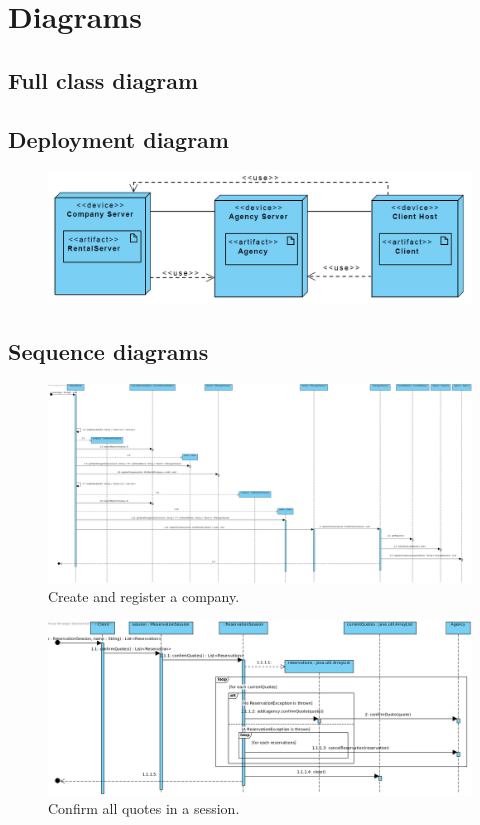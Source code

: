 \documentclass[10pt,a4paper]{article}
\begin{document}
\section{Diagrams}

\subsection{Full class diagram}
 
\clearpage

\subsection{Deployment diagram}
\begin{figure}[ht!]
\centering
\includegraphics[width=160mm]{DeploymentDiagram.png}
\label{deploymentdiagram}
\end{figure}

\clearpage

\subsection{Sequence diagrams}

\begin{figure}[ht!]
\centering
\includegraphics[width=160mm]{registerCompany.png}
\caption{Create and register a company.} 
\end{figure}

\begin{figure}[ht!]
\centering
\includegraphics[width=160mm]{confirmQuotes.png}
\caption{Confirm all quotes in a session.} 
\end{figure}
\end{document}
